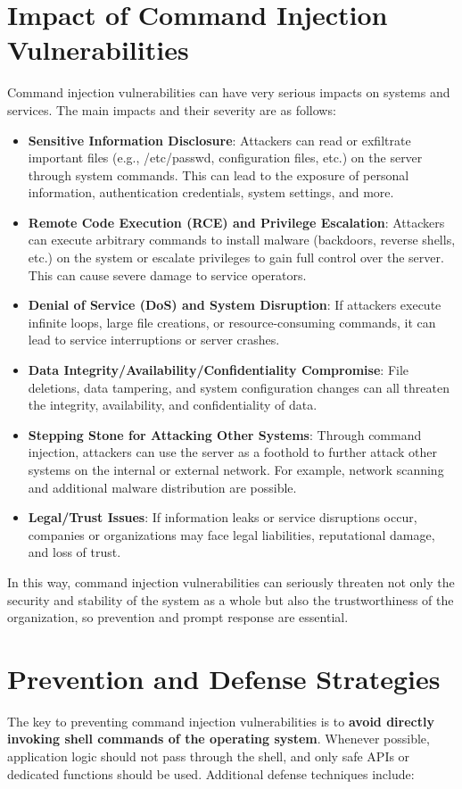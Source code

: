 \documentclass{article}
\begin{document}
\section*{Impact of Command Injection Vulnerabilities}

Command injection vulnerabilities can have very serious impacts on systems and services. The main impacts and their severity are as follows:

\begin{itemize}
  \item \textbf{Sensitive Information Disclosure}: Attackers can read or exfiltrate important files (e.g., /etc/passwd, configuration files, etc.) on the server through system commands. This can lead to the exposure of personal information, authentication credentials, system settings, and more.
  \item \textbf{Remote Code Execution (RCE) and Privilege Escalation}: Attackers can execute arbitrary commands to install malware (backdoors, reverse shells, etc.) on the system or escalate privileges to gain full control over the server. This can cause severe damage to service operators.
  \item \textbf{Denial of Service (DoS) and System Disruption}: If attackers execute infinite loops, large file creations, or resource-consuming commands, it can lead to service interruptions or server crashes.
  \item \textbf{Data Integrity/Availability/Confidentiality Compromise}: File deletions, data tampering, and system configuration changes can all threaten the integrity, availability, and confidentiality of data.
  \item \textbf{Stepping Stone for Attacking Other Systems}: Through command injection, attackers can use the server as a foothold to further attack other systems on the internal or external network. For example, network scanning and additional malware distribution are possible.
  \item \textbf{Legal/Trust Issues}: If information leaks or service disruptions occur, companies or organizations may face legal liabilities, reputational damage, and loss of trust.
\end{itemize}

In this way, command injection vulnerabilities can seriously threaten not only the security and stability of the system as a whole but also the trustworthiness of the organization, so prevention and prompt response are essential.

\section*{Prevention and Defense Strategies}
The key to preventing command injection vulnerabilities is to \textbf{avoid directly invoking shell commands of the operating system}. Whenever possible, application logic should not pass through the shell, and only safe APIs or dedicated functions should be used. Additional defense techniques include:
\end{document}
